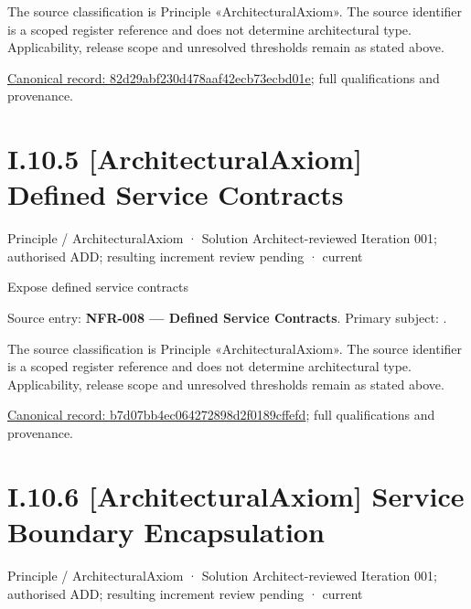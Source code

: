 The source classification is Principle «ArchitecturalAxiom». The source identifier is a scoped register reference and does not determine architectural type. Applicability, release scope and unresolved thresholds remain as stated above.


{\footnotesize \href{../../../../continuum/motivation/principle/architectural-axiom/82d29abf230d478aaf42ecb73ecbd01e.md}{Canonical record: 82d29abf230d478aaf42ecb73ecbd01e}; full qualifications and provenance.}\par
\section*{I.10.5 [ArchitecturalAxiom] Defined Service Contracts}
\label{navigation:I.10.5}

\label{element:b7d07bb4ec064272898d2f0189cffefd}
{\small Principle / ArchitecturalAxiom · Solution Architect-reviewed Iteration 001; authorised ADD; resulting increment review pending · current}\par

Expose defined service contracts



Source entry: \textbf{NFR-008 — Defined Service Contracts}. Primary subject: \texttt{}.



The source classification is Principle «ArchitecturalAxiom». The source identifier is a scoped register reference and does not determine architectural type. Applicability, release scope and unresolved thresholds remain as stated above.


{\footnotesize \href{../../../../continuum/motivation/principle/architectural-axiom/b7d07bb4ec064272898d2f0189cffefd.md}{Canonical record: b7d07bb4ec064272898d2f0189cffefd}; full qualifications and provenance.}\par
\section*{I.10.6 [ArchitecturalAxiom] Service Boundary Encapsulation}
\label{navigation:I.10.6}

\label{element:376363587388401194ff967b0fe80a5a}
{\small Principle / ArchitecturalAxiom · Solution Architect-reviewed Iteration 001; authorised ADD; resulting increment review pending · current}\par

